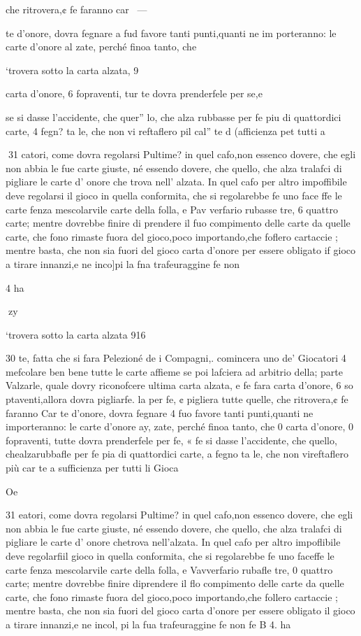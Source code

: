 \documentclass[12pt,a6paper]{article}
\begin{document}
che ritrovera,¢ fe faranno car~ —

te d’onore, dovra fegnare a fud
favore tanti punti,quanti ne im
porteranno: le carte d’onore al
zate, perché finoa tanto, che

‘trovera sotto la carta alzata, 9

carta d’onore, 6 fopraventi, tur
te dovra prenderfele per se,e

se si dasse l’accidente, che quer”
lo, che alza rubbasse per fe piu
di quattordici carte, 4 fegn? ta
le, che non vi reftaflero pil cal”
te d (afficienza pet tutti a

 
31
catori, come dovra regolarsi
Pultime? in quel cafo,non essenco dovere, che egli non abbia
le fue carte giuste, né essendo
dovere, che quello, che alza
tralafci di pigliare le carte d’
onore che trova nell’ alzata. In
quel cafo per altro impoffibile
deve regolarsi il gioco in quella
conformita, che si regolarebbe
fe uno face ffe le carte fenza mescolarvile carte della folla, e
Pav verfario rubasse tre, 6 quattro carte; mentre dovrebbe
finire di prendere il fuo compimento delle carte da quelle
carte, che fono rimaste fuora
del gioco,poco importando,che
foflero cartaccie ; mentre basta,
che non sia fuori del gioco carta d’onore per essere obligato if
gioco a tirare innanzi,e ne inco]pi la fna trafeuraggine fe non

4 ha

 

 
zy

‘trovera sotto la carta alzata 916

30
te, fatta che si fara Pelezioné
de i Compagni,. comincera uno
de’ Giocatori 4 mefcolare ben
bene tutte le carte affieme se
poi lafciera ad arbitrio della;
parte Valzarle, quale dovry
riconofcere ultima carta alzata, e fe fara carta d’onore, 6 so
ptaventi,allora dovra pigliarfe.
la per fe, ¢ pigliera tutte quelle,
che ritrovera,¢ fe faranno Car
te d’onore, dovra fegnare 4 fuo
favore tanti punti,quanti ne importeranno: le carte d’onore ay,
zate, perché finoa tanto, che
0
carta d’onore, 0 fopraventi, tutte dovra prenderfele per fe, «
fe si dasse l’accidente, che quello, chealzarubbafle per fe pia
di quattordici carte, a fegno ta
le, che non vireftaflero più car
te a sufficienza per tutti li Gioca 

Oe

31
eatori, come dovra regolarsi
Pultime? in quel cafo,non essenco dovere, che egli non abbia
le fue carte giuste, né essendo
dovere, che quello, che alza
tralafci di pigliare le carte d’
onore chetrova nell’alzata. In
quel cafo per altro impoflibile
deve regolarfiil gioco in quella
conformita, che si regolarebbe
fe uno faceffe le carte fenza mescolarvile carte della folla, e
Vavverfario rubafle tre, 0 quattro carte; mentre dovrebbe
finire diprendere il flo compimento delle carte da quelle
carte, che fono rimaste fuora
del gioco,poco importando,che
follero cartaccie ; mentre basta,
che non sia fuori del gioco carta d’onore per essere obligato il
gioco a tirare innanzi,e ne incol, pi la fua trafeuraggine fe non
fe B 4. ha
 
\end{document}

